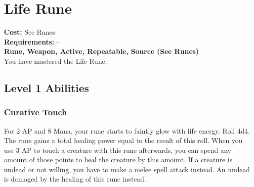 \twocolumn
\section{Life Rune}\label{rune:life}
\textbf{Cost:} See Runes\\
\textbf{Requirements:} -\\
\textbf{Rune, Weapon, Active, Repeatable, Source (See Runes)}\\
You have mastered the Life Rune.

\subsection{Level 1 Abilities}

\subsubsection{Curative Touch}
For 2 AP and 8 Mana, your rune starts to faintly glow with life energy.
Roll 4d4.
The rune gains a total healing power equal to the result of this roll.
When you use 3 AP to touch a creature with this rune afterwards, you can spend any amount of those points to heal the creature by this amount.
If a creature is undead or not willing, you have to make a melee spell attack instead.
An undead is damaged by the healing of this rune instead.